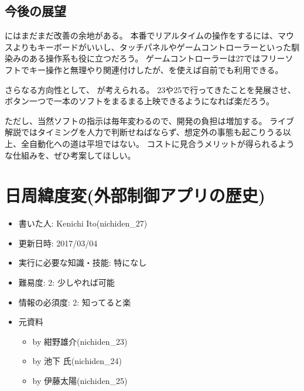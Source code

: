 \documentclass[letterpaper,10pt,dvipdfmx]{sphinxmanual}
\begin{document}
\section{今後の展望}
\label{\detokenize{nissyu-idohen/pc-software:}}\label{\detokenize{nissyu-idohen/pc-software:id9}}
 にはまだまだ改善の余地がある。
本番でリアルタイムの操作をするには、マウスよりもキーボードがいいし、タッチパネルやゲームコントローラーといった馴染みのある操作系も役に立つだろう。
ゲームコントローラーは27ではフリーソフトでキー操作と無理やり関連付けしたが、を使えば自前でも利用できる。

さらなる方向性として、 が考えられる。
23や25で行ってきたことを発展させ、ボタン一つで一本のソフトをまるまる上映できるようになれば楽だろう。

ただし、当然ソフトの指示は毎年変わるので、開発の負担は増加する。
ライブ解説ではタイミングを人力で判断せねばならず、想定外の事態も起こりうる以上、全自動化への道は平坦ではない。
コストに見合うメリットが得られるような仕組みを、ぜひ考案してほしい。


\chapter{日周緯度変(外部制御アプリの歴史)}
\label{\detokenize{nissyu-idohen/pc-software-history:}}\label{\detokenize{nissyu-idohen/pc-software-history::doc}}\label{\detokenize{nissyu-idohen/pc-software-history:id1}}\begin{itemize}
\item {} 
書いた人: Kenichi Ito(nichiden\_27)

\item {} 
更新日時: 2017/03/04

\item {} 
実行に必要な知識・技能: 特になし

\item {} 
難易度: 2: 少しやれば可能

\item {} 
情報の必須度: 2: 知ってると楽

\item {} 
元資料
\begin{itemize}
\item {} 
 by 紺野雄介(nichiden\_23)

\item {} 
 by 池下 氏(nichiden\_24)

\item {} 
 by 伊藤太陽(nichiden\_25)

\end{itemize}

\end{itemize}
\end{document}
